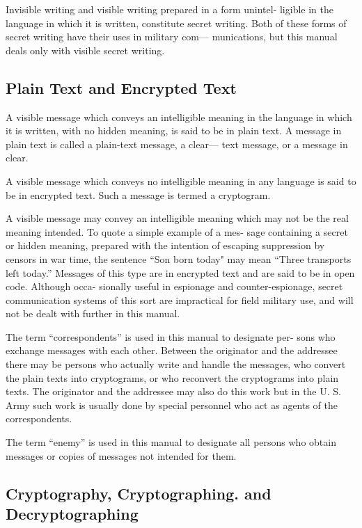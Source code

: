 \mypara Invisible writing and visible writing prepared in a form unintel-
ligible in the language in which it is written, constitute secret writing.
Both of these forms of secret writing have their uses in military com—
munications, but this manual deals only with visible secret writing.

\subsection{Plain Text and Encrypted Text}

\mypara A visible message which conveys an intelligible meaning in the
language in which it is written, with no hidden meaning, is said to be in
plain text. A message in plain text is called a plain-text message, a clear—
text message, or a message in clear.

\mypara A visible message which conveys no intelligible meaning in any
language is said to be in encrypted text. Such a message is termed a
cryptogram.

\mypara A visible message may convey an intelligible meaning which may
not be the real meaning intended. To quote a simple example of a mes-
sage containing a secret or hidden meaning, prepared with the intention
of escaping suppression by censors in war time, the sentence “Son born
today" may mean “Three transports left today.” Messages of this type
are in encrypted text and are said to be in open code. Although occa-
sionally useful in espionage and counter-espionage, secret communication
systems of this sort are impractical for ﬁeld military use, and will not
be dealt with further in this manual.

\mypara The term “correspondents” is used in this manual to designate per-
sons who exchange messages with each other. Between the originator
and the addressee there may be persons who actually write and handle
the messages, who convert the plain texts into cryptograms, or who
reconvert the cryptograms into plain texts. The originator and the
addressee may also do this work but in the U. S. Army such work is
usually done by special personnel who act as agents of the correspondents.

\mypara The term “enemy” is used in this manual to designate all persons
who obtain messages or copies of messages not intended for them.

\subsection{Cryptography, Cryptographing. and Decryptographing}

